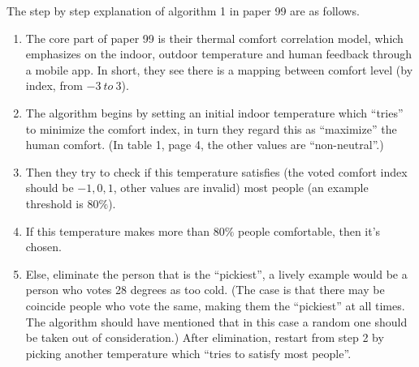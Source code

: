 \documentclass{article}
\begin{document}
The step by step explanation of algorithm 1 in paper 99 are as
follows. 
\begin{enumerate}
\item The core part of paper 99 is their thermal comfort correlation
  model, which emphasizes on the indoor, outdoor temperature and human
  feedback through a mobile app. In short, they see there is a mapping
  between comfort level (by index, from $-3~to~3$).
\item The algorithm begins by setting an initial indoor temperature
  which ``tries'' to minimize the comfort index, in turn they regard
  this as ``maximize'' the human comfort. (In table 1, page 4, the
  other values are ``non-neutral''.)
\item Then they try to check if this temperature satisfies (the voted
  comfort index should be $-1,0,1$, other values are invalid) most
  people (an example threshold is $80\%$).
\item If this temperature makes more than $80\%$ people comfortable,
  then it's chosen.
\item Else, eliminate the person that is the ``pickiest'', a lively
  example would be a person who votes 28 degrees as too cold. (The
  case is that there may be coincide people who vote the same, making
  them the ``pickiest'' at all times. The algorithm should have
  mentioned that in this case a random one should be taken out of
  consideration.) After elimination, restart from step 2 by picking
  another temperature which ``tries to satisfy most people''.
\end{enumerate}
\end{document}
